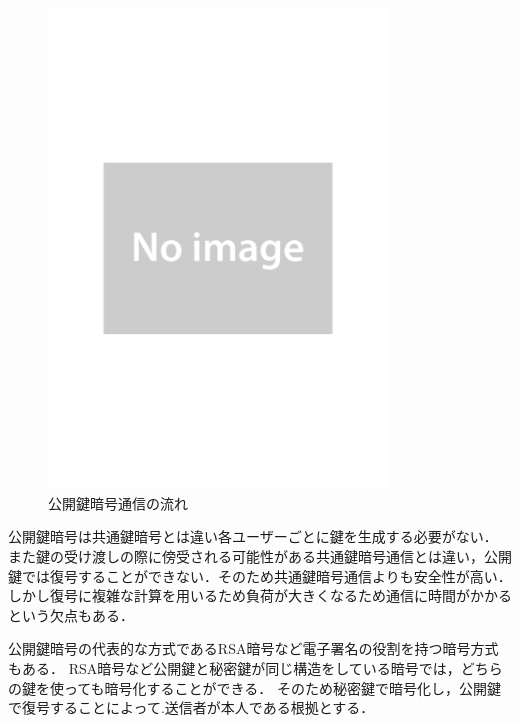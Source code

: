 \documentclass[a4j,12pt]{jsarticle}
\begin{document}
\begin{figure}[H]
\centering
\includegraphics[width=9cm]{noimage.pdf}
\caption{公開鍵暗号通信の流れ}
\label{fig:no}
\end{figure} 

公開鍵暗号は共通鍵暗号とは違い各ユーザーごとに鍵を生成する必要がない．
また鍵の受け渡しの際に傍受される可能性がある共通鍵暗号通信とは違い，公開鍵では復号することができない．そのため共通鍵暗号通信よりも安全性が高い．しかし復号に複雑な計算を用いるため負荷が大きくなるため通信に時間がかかるという欠点もある．


公開鍵暗号の代表的な方式であるRSA暗号など電子署名の役割を持つ暗号方式もある．
RSA暗号など公開鍵と秘密鍵が同じ構造をしている暗号では，どちらの鍵を使っても暗号化することができる．
そのため秘密鍵で暗号化し，公開鍵で復号することによって.送信者が本人である根拠とする．
\end{document}
